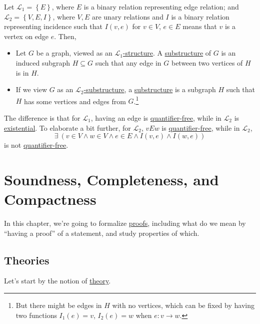\begin{eg}
	Let \(\mathcal{L} _1 = \left\{ E \right\} \), where \(E\) is a binary relation representing edge relation; and \(\mathcal{L} _2 = \left\{ V, E, I \right\} \), where \(V, E\) are unary relations and \(I\) is a binary relation representing incidence such that \(I(v, e)\) for \(v\in V\), \(e\in E\) means that \(v\) is a vertex on edge \(e\). Then,
	\begin{itemize}
		\item Let \(G\) be a graph, viewed as an \hyperref[def:structure]{\(\mathcal{L} _1\)-structure}. A \hyperref[def:substructure]{substructure} of \(G\) is an induced subgraph \(H \subseteq G\) such that any edge in \(G\) between two vertices of \(H\) is in \(H\).
		\item If we view \(G\) as an \hyperref[def:substructure]{\(\mathcal{L} _2\)-substructure}, a \hyperref[def:substructure]{substructure} is a subgraph \(H\) such that \(H\) has some vertices and edges from \(G\).\footnote{But there might be edges in \(H\) with no vertices, which can be fixed by having two functions \(I_1(e)=v\), \(I_2(e)=w\) when \(e\colon v \to w\).}
	\end{itemize}
\end{eg}

\begin{remark}
	The difference is that for \(\mathcal{L} _1\), having an edge is \hyperref[not:quantifier-free]{quantifier-free}, while in \(\mathcal{L} _2\) is \hyperref[not:existential]{existential}. To elaborate a bit further, for \(\mathcal{L} _2\), \(vEw\) is \hyperref[not:quantifier-free]{quantifier-free}, while in \(\mathcal{L} _2\),
	\[
		\exists \ (v\in V \land w\in V \land e\in E \land I(v, e) \land I(w, e))
	\]
	is not \hyperref[not:quantifier-free]{quantifier-free}.
\end{remark}

\chapter{Soundness, Completeness, and Compactness}
In this chapter, we're going to formalize \hyperref[def:proof]{proofs}, including what do we mean by ``having a proof'' of a statement, and study properties of which.

\section{Theories}
Let's start by the notion of \hyperref[def:theory]{theory}.

